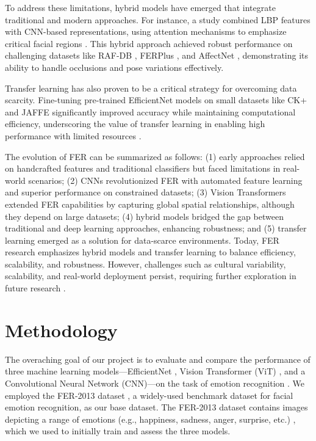 \documentclass[sigconf]{acmart}
\begin{document}
To address these limitations, hybrid models have emerged that integrate traditional and modern approaches. For instance, a study combined LBP features with CNN-based representations, using attention mechanisms to emphasize critical facial regions \cite{ma2021}. This hybrid approach achieved robust performance on challenging datasets like RAF-DB \cite{li2017reliable}, FERPlus \cite{barsoum2016training}, and AffectNet \cite{8013713}, demonstrating its ability to handle occlusions and pose variations effectively.

Transfer learning has also proven to be a critical strategy for overcoming data scarcity. Fine-tuning pre-trained EfficientNet models on small datasets like CK+ and JAFFE significantly improved accuracy while maintaining computational efficiency, underscoring the value of transfer learning in enabling high performance with limited resources \cite{alam2022}.

The evolution of FER can be summarized as follows: (1) early approaches relied on handcrafted features and traditional classifiers but faced limitations in real-world scenarios; (2) CNNs revolutionized FER with automated feature learning and superior performance on constrained datasets; (3) Vision Transformers extended FER capabilities by capturing global spatial relationships, although they depend on large datasets; (4) hybrid models bridged the gap between traditional and deep learning approaches, enhancing robustness; and (5) transfer learning emerged as a solution for data-scarce environments. Today, FER research emphasizes hybrid models and transfer learning to balance efficiency, scalability, and robustness. However, challenges such as cultural variability, scalability, and real-world deployment persist, requiring further exploration in future research \cite{jeong2018, tan2019, alam2022, febrian2024, ma2021, roka2023, kopalidis2024advances}.


\section{Methodology}

The overaching goal of our project is to evaluate and compare the performance of three machine learning models—EfficientNet \cite{tan2019}, Vision Transformer (ViT) \cite{dosovitskiy2020image}, and a Convolutional Neural Network (CNN)—on the task of emotion recognition \cite{kopalidis2024advances}. We employed the FER-2013 dataset \cite{fer2013kaggle}, a widely-used benchmark dataset for facial emotion recognition, as our base dataset. The FER-2013 dataset contains images depicting a range of emotions (e.g., happiness, sadness, anger, surprise, etc.) \cite{fer2013kaggle}, which we used to initially train and assess the three models.
\end{document}
